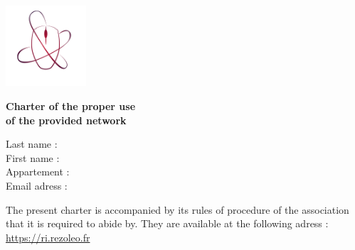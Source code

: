\documentclass[12pt]{article}
\begin{document}
	
\thispagestyle{empty}

\begin{minipage}{0.2\linewidth}
	\includegraphics[height=3cm]{rezoleo.png}
\end{minipage}\hfill
\begin{minipage}{0.75\linewidth}
\LARGE \textbf{Charter of the proper use\\ of the provided network}
\end{minipage}


\begin{flushright}
	\begin{minipage}{0.5\linewidth}
		Last name : \dotfill\\
		First name : \dotfill\\
		Appartement : \dotfill\\
		Email adress : \dotfill
	\end{minipage}
\end{flushright}

\vspace*{0.5cm}
The present charter is accompanied by its rules of procedure of the association that it is required to abide by. They are available at the following adress : \url{https://ri.rezoleo.fr}

\vspace*{0.5cm}
\end{document}
